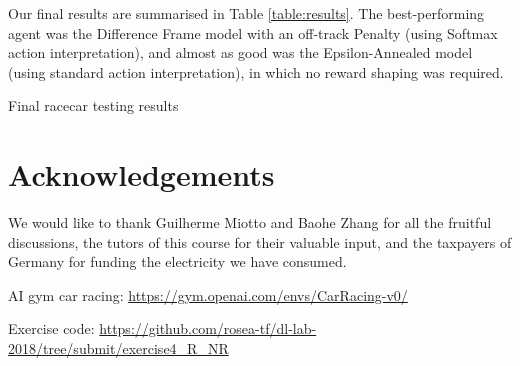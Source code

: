 \documentclass[a4paper, 11pt, conference]{ieeeconf}      %
\begin{document}
Our final results are summarised in Table \ref{table:results}. The best-performing agent was the Difference Frame model with an off-track Penalty (using Softmax action interpretation), and almost as good was the Epsilon-Annealed model (using standard action interpretation), in which no reward shaping was required.

\begin{table}
  \centering
  \caption{Final racecar testing results}
  \label{table:results}
  
  \end{table}

\section*{Acknowledgements}

We would like to thank Guilherme Miotto and Baohe Zhang for all the fruitful discussions, the tutors of this course for their valuable input, and the taxpayers of Germany for funding the electricity we have consumed.



\begin{thebibliography}{99}

 AI gym car racing: \url{https://gym.openai.com/envs/CarRacing-v0/}

 Exercise code: \url{https://github.com/rosea-tf/dl-lab-2018/tree/submit/exercise4_R_NR}

\end{thebibliography}

\end{document}
